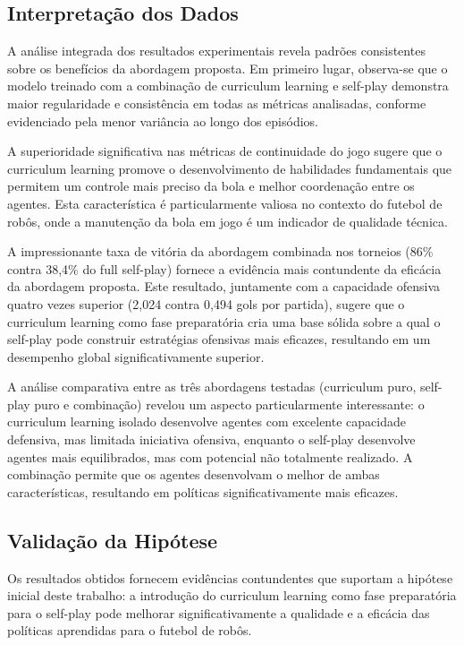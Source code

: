 \subsection{Interpretação dos Dados}

A análise integrada dos resultados experimentais revela padrões consistentes sobre os benefícios da abordagem proposta. Em primeiro lugar, observa-se que o modelo treinado com a combinação de curriculum learning e self-play demonstra maior regularidade e consistência em todas as métricas analisadas, conforme evidenciado pela menor variância ao longo dos episódios.

A superioridade significativa nas métricas de continuidade do jogo sugere que o curriculum learning promove o desenvolvimento de habilidades fundamentais que permitem um controle mais preciso da bola e melhor coordenação entre os agentes. Esta característica é particularmente valiosa no contexto do futebol de robôs, onde a manutenção da bola em jogo é um indicador de qualidade técnica.

A impressionante taxa de vitória da abordagem combinada nos torneios (86\% contra 38,4\% do full self-play) fornece a evidência mais contundente da eficácia da abordagem proposta. Este resultado, juntamente com a capacidade ofensiva quatro vezes superior (2,024 contra 0,494 gols por partida), sugere que o curriculum learning como fase preparatória cria uma base sólida sobre a qual o self-play pode construir estratégias ofensivas mais eficazes, resultando em um desempenho global significativamente superior.

A análise comparativa entre as três abordagens testadas (curriculum puro, self-play puro e combinação) revelou um aspecto particularmente interessante: o curriculum learning isolado desenvolve agentes com excelente capacidade defensiva, mas limitada iniciativa ofensiva, enquanto o self-play desenvolve agentes mais equilibrados, mas com potencial não totalmente realizado. A combinação permite que os agentes desenvolvam o melhor de ambas características, resultando em políticas significativamente mais eficazes.

\subsection{Validação da Hipótese}

Os resultados obtidos fornecem evidências contundentes que suportam a hipótese inicial deste trabalho: a introdução do curriculum learning como fase preparatória para o self-play pode melhorar significativamente a qualidade e a eficácia das políticas aprendidas para o futebol de robôs.

